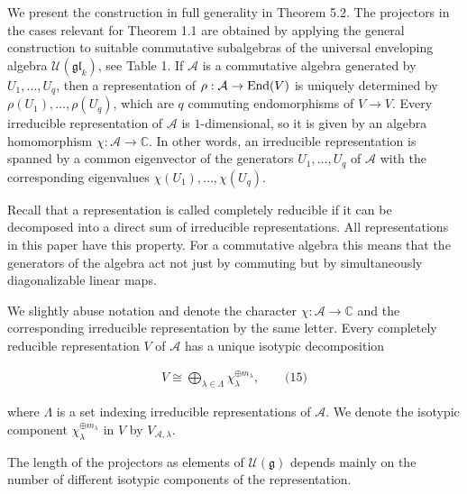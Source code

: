 \documentclass[10pt,a4paper]{article}
\begin{document}
We present the construction in full generality in Theorem 5.2. The projectors in the cases relevant for Theorem 1.1 are obtained by applying the general construction to suitable commutative subalgebras of the universal enveloping algebra $\mathcal{U}(\mathfrak{gl}_{k})$, see Table 1. If $\mathcal{A}$ is a commutative algebra generated by $U_{1},\dots,U_{q}$, then a representation of $\rho:\mathcal{A}\to\textnormal{End}(V)$ is uniquely determined by $\rho(U_{1}),\ldots,\rho(U_{q})$, which are $q$ commuting endomorphisms of $V\to V$.
Every irreducible representation of $\mathcal{A}$ is $1$-dimensional, so it is given by an algebra homomorphism $\chi\colon\mathcal{A}\to\mathbb{C}$.
In other words, an irreducible representation is spanned by a common eigenvector of the generators $U_{1},\dots,U_{q}$ of $\mathcal{A}$ with the corresponding eigenvalues $\chi(U_{1}),\dots,\chi(U_{q})$.





Recall that a representation is called completely reducible if it can be decomposed into a direct sum of irreducible representations.
All representations in this paper have this property.
For a commutative algebra this means that the generators of the algebra act not just by commuting but by simultaneously diagonalizable linear maps.





We slightly abuse notation and denote the character $\chi\colon\mathcal{A}\to\mathbb{C}$ and the corresponding irreducible representation by the same letter.
Every completely reducible representation $V$ of $\mathcal{A}$ has a unique isotypic decomposition



\[\begin{aligned}
\displaystyle V\cong\bigoplus_{\lambda\in\Lambda}\chi_{\lambda}^{\oplus m_{\lambda}},\qquad\text{(15)}
\end{aligned}\]


where $\Lambda$ is a set indexing irreducible representations of $\mathcal{A}$.
We denote the isotypic component $\chi_{\lambda}^{\oplus m_{\lambda}}$ in $V$ by $V_{\mathcal{A},\lambda}$.





The length of the projectors as elements of $\mathcal{U}(\mathfrak{g})$ depends mainly on the number of different isotypic components of the representation.
\end{document}

